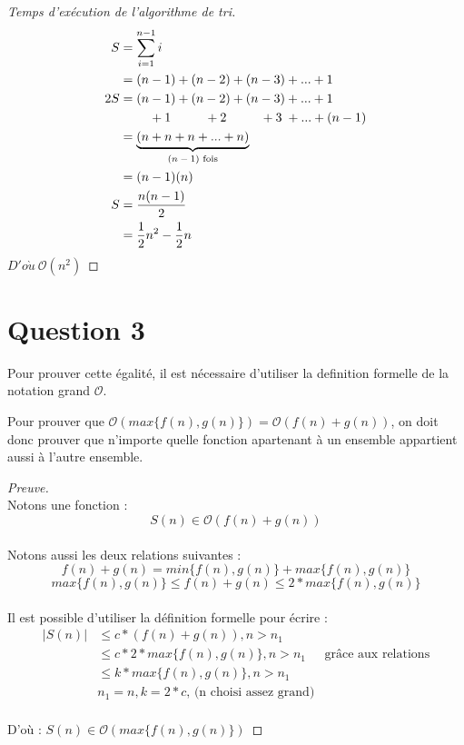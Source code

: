 \documentclass[12pt]{article}
\begin{document}
    \begin{proof}[Temps d'exécution de l'algorithme de tri]
      \begin{align*}
        S   &= \sum _ {i=1} ^ {n - 1} i \\
            &= (n - 1) + (n - 2) + (n - 3) + ... + 1 \\
        2S  &= (n - 1) + (n - 2) + (n - 3) + ... + 1 \\
            &\qquad\,\, + 1 \qquad\;\:\, + 2 \qquad\;\:\, + 3 \;+ ... + (n - 1) \\
            &= \underbrace{(n + n + n + ... + n)}_\textrm{\( (n - 1) \) fois} \\
            &= (n - 1)(n) \\
        S   &= \frac{n(n - 1)}{2} \\
            &= \frac{1}{2}n^2 - \frac{1}{2}n
      \end{align*}
      \( D'o\grave{u} \ \mathcal{O}(n^2) \)
    \end{proof}

  \newpage

  \section*{Question 3}
  Pour prouver cette égalité, il est nécessaire d'utiliser la definition
  formelle de la notation grand \( \mathcal{O} \). \newline

  \noindent Pour prouver que
  \( \mathcal{O}({max\{f(n), g(n)\}}) = \mathcal{O}(f(n) + g(n)) \), on doit
  donc prouver que n'importe quelle fonction apartenant à un ensemble appartient
  aussi à l'autre ensemble. \\

  \begin{proof}[Preuve]
    \noindent \\ Notons une fonction : \[ S(n) \in \mathcal{O}(f(n) + g(n)) \] \\

    \noindent Notons aussi les deux relations suivantes :
    \[ f(n) + g(n) = min\{f(n), g(n)\} + max\{f(n), g(n)\} \]
    \[ max\{f(n), g(n)\} \leq f(n) + g(n) \leq 2 * max\{f(n), g(n)\} \] \\

    \noindent Il est possible d'utiliser la définition formelle pour écrire :
    \begin{align*}
      | S(n) |  &\leq c * (f(n) + g(n)), n > n_1 \\
                &\leq c * 2 * max\{f(n), g(n)\}, n > n_1 &\text{grâce aux relations} \\
                &\leq k * max\{f(n), g(n)\}, n > n_1 \\
                & n_1 = n, k = 2 * c \text{, (n choisi assez grand)} \\
    \end{align*}

    \noindent D'où :
    \( S(n) \in \mathcal{O}({max\{f(n), g(n)\}}) \)
  \end{proof}
\end{document}
